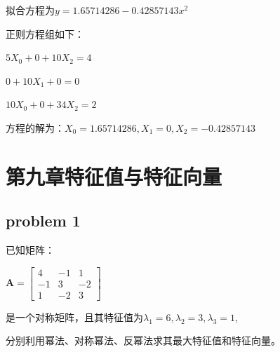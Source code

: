 \documentclass[UTF8]{ctexart}
\begin{document}
拟合方程为$ y=1.65714286-0.42857143x^2$

正则方程组如下：

$5X_0+0+10X_2=4 $

$0+10X_1+0=0 $

$10X_0+0+34X_2=2 $

方程的解为：$X_0=1.65714286 , X_1=0 , X_2=-0.42857143$
\newpage

\section{第九章特征值与特征向量}
\subsection{problem 1}
已知矩阵：

$\mathbf{A}=\left[\begin{array}{ccc}{4} & {-1} & {1} \\ {-1} & {3} & {-2} \\ {1} & {-2} & {3}\end{array}\right]$

是一个对称矩阵，且其特征值为$ \lambda_1 =6, \lambda_2 =3, \lambda_3 =1 $,

分别利用幂法、对称幂法、反幂法求其最大特征值和特征向量。
\end{document}

